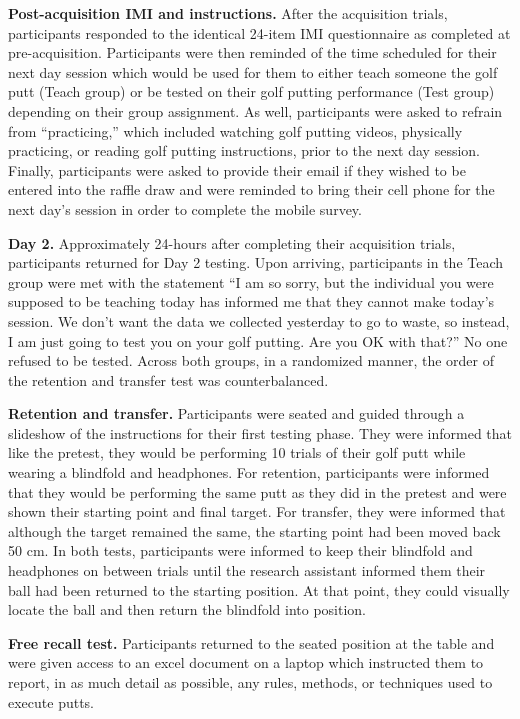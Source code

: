 \documentclass[
  english,
  man,floatsintext]{apa7}
\begin{document}
\textbf{Post-acquisition IMI and instructions.} After the acquisition trials, participants responded to the identical 24-item IMI questionnaire as completed at pre-acquisition. Participants were then reminded of the time scheduled for their next day session which would be used for them to either teach someone the golf putt (Teach group) or be tested on their golf putting performance (Test group) depending on their group assignment. As well, participants were asked to refrain from ``practicing,'' which included watching golf putting videos, physically practicing, or reading golf putting instructions, prior to the next day session. Finally, participants were asked to provide their email if they wished to be entered into the raffle draw and were reminded to bring their cell phone for the next day's session in order to complete the mobile survey.

\textbf{Day 2.} Approximately 24-hours after completing their acquisition trials, participants returned for Day 2 testing. Upon arriving, participants in the Teach group were met with the statement ``I am so sorry, but the individual you were supposed to be teaching today has informed me that they cannot make today's session. We don't want the data we collected yesterday to go to waste, so instead, I am just going to test you on your golf putting. Are you OK with that?'' No one refused to be tested. Across both groups, in a randomized manner, the order of the retention and transfer test was counterbalanced.

\textbf{Retention and transfer.} Participants were seated and guided through a slideshow of the instructions for their first testing phase. They were informed that like the pretest, they would be performing 10 trials of their golf putt while wearing a blindfold and headphones. For retention, participants were informed that they would be performing the same putt as they did in the pretest and were shown their starting point and final target. For transfer, they were informed that although the target remained the same, the starting point had been moved back 50 cm. In both tests, participants were informed to keep their blindfold and headphones on between trials until the research assistant informed them their ball had been returned to the starting position. At that point, they could visually locate the ball and then return the blindfold into position.

\textbf{Free recall test.} Participants returned to the seated position at the table and were given access to an excel document on a laptop which instructed them to report, in as much detail as possible, any rules, methods, or techniques used to execute putts.
\end{document}
